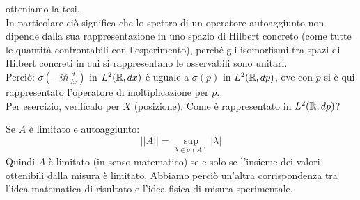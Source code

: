 \documentclass[../../FisicaTeorica.tex]{subfiles}
\begin{document}
\begin{enumerate}
	\begin{comment}
	\begin{align*} %
	\inf_{\psi\in D\left(U^{\dag A}\ U\right)}{\left(\Delta\left(U^\dag\ A\ U\right)\right)_{a,\psi}^2&=\inf_{\psi\in D\left(U^\dag A\ U\right)}{\left|\left|\left(U^\dag A\ U-a\right)\psi\right|\right|^2}}=\inf_{\psi\in D\left(U^\dag A\ U\right)}{\left|\left|U^\dag\left(A-a\right)U\psi\right|\right|^2}\\
	&=\inf_{\psi\in D\left(U^\dag A U\right)}{\left|\left|\left(A-a\right)U\psi\right|\right|=\inf_{\phi\in D\left(A\right)}{\left|\left|\left(A-a\right)\phi\right|\right|^2}=\inf_{\phi\in D\left(A\right)}{\left(\Delta A\right)_{a,\phi}^2\ }}
	\end{align*}
	\end{comment}
	otteniamo la tesi.\\
	In particolare ciò significa che lo spettro di un operatore autoaggiunto non dipende dalla sua rappresentazione in uno spazio di Hilbert concreto (come tutte le quantità confrontabili con l'esperimento), perché gli isomorfismi tra spazi di Hilbert concreti in cui si rappresentano le osservabili sono unitari.\\
	Perciò: 
	$\sigma \left(-i\hbar\frac{d}{dx}\right)$ in $L^2(\mathbb{R}, dx)$ è uguale a $\sigma \left(p\right)$ in $L^2(\mathbb{R},dp)$, ove con $p$ si è qui rappresentato l'operatore di moltiplicazione per $p$.\\
	Per esercizio, verificalo per $X$ (posizione). Come è rappresentato in $L^2(\mathbb{R}, dp)$?
	\begin{oss}
	Se $A$ è limitato e autoaggiunto:
	\[
	\left|\left|A\right|\right|=\sup_{\lambda\in\sigma\left(A\right)}{\left|\lambda\right|}
	\]
	Quindi $A$ è limitato (in senso matematico) se e solo se l'insieme dei valori ottenibili dalla misura è limitato. Abbiamo perciò un'altra corrispondenza tra l'idea matematica di risultato e l'idea fisica di misura sperimentale.
	\end{oss}

\end{enumerate}
\end{document}
